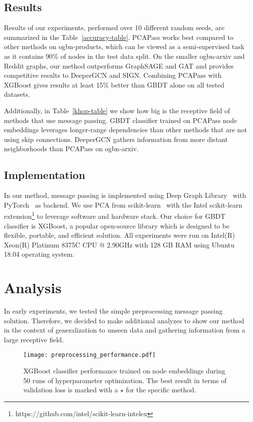 \documentclass[nohyperref]{article}
\theoremstyle{plain}
\theoremstyle{definition}
\theoremstyle{remark}
\begin{document}
\subsection{Results}
Results of our experiments, performed over 10 different random seeds, are summarized in the Table~\ref{accuracy-table}.
PCAPass works best compared to other methods on ogbn-products, which can be viewed as a semi-supervised task as it contains 90\%  of nodes in the test data split. 
On the smaller ogbn-arxiv and Reddit graphs, our method outperforms GraphSAGE and GAT and provides competitive results to DeeperGCN and SIGN. 
Combining PCAPass with XGBoost gives results at least 15\% better than GBDT alone on all tested datasets.

Additionally, in Table~\ref{khop-table} we show how big is the receptive field of methods that use message passing.
GBDT classifier trained on PCAPass node embeddings leverages longer-range dependencies than other methods that are not using skip connections. DeeperGCN gathers information from more distant neighborhoods than PCAPass on ogbn-arxiv.

\subsection{Implementation}
In our method, message passing is implemented using Deep Graph Library~\cite{wang2020deep} with PyTorch~\cite{paszke2019pytorch} as backend. We use PCA from scikit-learn~\cite{pedregosa2018scikitlearn} with the Intel scikit-learn extension\footnote{https://github.com/intel/scikit-learn-intelex} to leverage software and hardware stack. Our choice for GBDT classifier is XGBoost, a popular open-source library which is designed to be flexible, portable, and efficient solution. All experiments were run on Intel(R) Xeon(R) Platinum 8375C CPU @ 2.90GHz with 128 GB RAM using Ubuntu 18.04 operating system.

\section{Analysis}
In early experiments, we tested the simple preprocessing message passing solution. 
Therefore, we decided to make additional analyzes to show our method in the context of generalization to unseen data and gathering information from a large receptive field.

\begin{figure}[H]
    \vskip 0.2in
    \begin{center}
    \centerline{\texttt{[image: preprocessing\_performance.pdf]}}
    \caption{XGBoost classifier performance trained on node embeddings during 50 runs of hyperparameter optimization. The best result in terms of validation loss is marked with a \textbf{\large $\star$} for the specific method.}
    \label{fig:pcapass_validation}
    \end{center}
    \vskip -0.2in
\end{figure}
\end{document}
